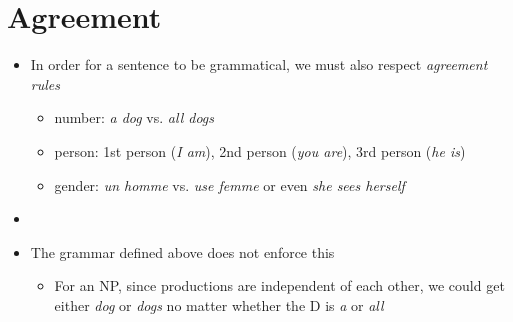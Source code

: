 \documentclass[11pt,letterpaper]{article}
\begin{document}
\section{Agreement}

\begin{itemize}
  \item In order for a sentence to be grammatical, we must also respect \textit{agreement rules} 
	\begin{itemize}
	  \item number: \textit{a dog} vs. \textit{all dogs}
	  \item person: 1st person (\textit{I am}), 2nd person (\textit{you are}), 3rd person (\textit{he is})
	  \item gender: \textit{un homme} vs. \textit{use femme} or even \textit{she sees herself}
	\end{itemize}

  \item[]
  \item The grammar defined above does not enforce this
	\begin{itemize}
	  \item For an NP, since productions are independent of each other, we could get either \textit{dog} or \textit{dogs} no matter whether the D is \textit{a} or \textit{all}
	\end{itemize}


\end{itemize}
\end{document}
